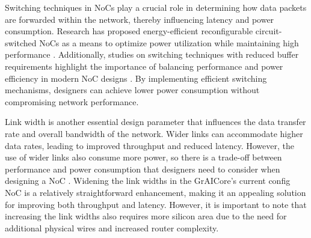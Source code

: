 

Switching techniques in NoCs play a crucial role in determining how data packets are forwarded within the network, thereby influencing latency and power consumption.
Research has proposed energy-efficient reconfigurable circuit-switched NoCs as a means to optimize power utilization while maintaining high performance \cite{wolkotteEnergyEfficientReconfigurableCircuitSwitched2005}.
Additionally, studies on switching techniques with reduced buffer requirements highlight the importance of balancing performance and power efficiency in modern NoC designs \cite{requenaEfficientSwitchingTechnique2008}.
By implementing efficient switching mechanisms, designers can achieve lower power consumption without compromising network performance.

Link width is another essential design parameter that influences the data transfer rate and overall bandwidth of the network.
Wider links can accommodate higher data rates, leading to improved throughput and reduced latency.
However, the use of wider links also consume more power, so there is a trade-off between performance and power consumption that designers need to consider when designing a NoC \cite{manhokimNetworkonchipLinkAnalysis2006}.
Widening the link widths in the GrAICore's current config NoC is a relatively straightforward enhancement, making it an appealing solution for improving both throughput and latency.
However, it is important to note that increasing the link widths also requires more silicon area due to the need for additional physical wires and increased router complexity.

